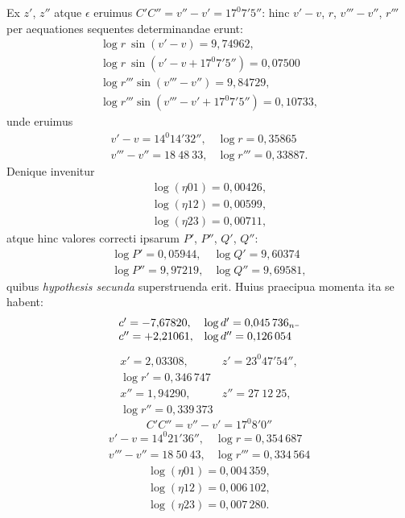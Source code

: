 Ex $z'$, $z''$ atque $\epsilon$ eruimus $C'C'' = v''-v' = 17^{0}7'5''$: hinc
$v'-v$, $r$, $v'''-v''$, $r'''$ per aequationes sequentes determinandae erunt:
\[
\begin{array}{l}
\log r\ \sin(v'-v) = 9{,}74962, \\ \log r\ \sin(v'-v+17^{0}7'5'') = 0{,}07500 \\
\log r'''\sin(v'''-v'') = 9{,}84729, \\ \log r'''\sin(v'''-v'+17^{0}7'5'') = 0{,}10733,
\end{array}
\]
unde eruimus
\[
\begin{array}{ll}
v'-v = 14^{0}14'32'', & \log r = 0{,}35865 \\
v'''-v'' = 18\ 48\ 33, & \log r''' = 0{,}33887.
\end{array}
\]
Denique invenitur
\[
\begin{gathered}
\log(\eta 01) = 0{,}00426, \\ \log(\eta 12) = 0{,}00599, \\ \log(\eta 23) = 0{,}00711,
\end{gathered}
\]
atque hinc valores correcti ipsarum $P'$, $P''$, $Q'$, $Q''$:
\[
\begin{array}{ll}
\log P' = 0{,}05944, & \log Q' = 9{,}60374 \\
\log P'' = 9{,}97219, & \log Q'' = 9{,}69581,
\end{array}
\]
quibus \emph{hypothesis secunda} superstruenda erit. Huius praecipua momenta
ita se habent:
\[
\begin{array}{ll}
c' = -7{,}67820, & \log d' = 0{,}045\,736_n\mathord{\rule[.1ex]{.35em}{.35pt}} \\
c'' = +2{,}21061, & \log d'' = 0{,}126\,054
\end{array}
\]
\[
\begin{array}{ll}
x' = 2{,}03308, & z' = 23^{0}47'54'',\\
\log r' = 0{,}346\,747 & \\
x'' = 1{,}94290, & z'' = 27\ 12\ 25,\\
\log r'' = 0{,}339\,373 & 
\end{array}
\]
\[
C'C'' = v''-v' = 17^{0}8'0''
\]
\[
\begin{array}{ll}
v'-v = 14^{0}21'36'', & \log r = 0{,}354\,687 \\
v'''-v'' = 18\ 50\ 43, & \log r''' = 0{,}334\,564
\end{array}
\]
\[
\begin{gathered}
\log(\eta 01) = 0{,}004\,359, \\ \log(\eta 12) = 0{,}006\,102, \\ \log(\eta 23) = 0{,}007\,280.
\end{gathered}
\]
